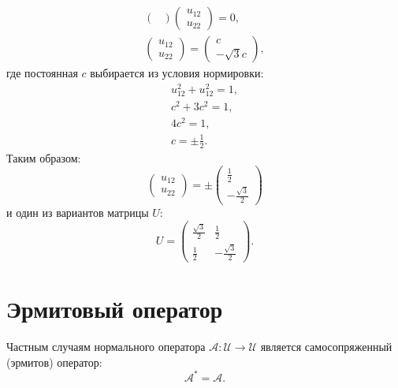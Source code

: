 \begin{example}
\begin{gather*}
\begin{pmatrix}
        \end{pmatrix}
        \begin{pmatrix}
            u_{12} \\
            u_{22}
        \end{pmatrix}
        = 0 , \\
        \begin{pmatrix}
            u_{12} \\
            u_{22}
        \end{pmatrix}
        = \begin{pmatrix}
              c \\
              - \sqrt{3}  c
        \end{pmatrix} ,
    \end{gather*}
    где постоянная $c$ выбирается из условия нормировки:
    \begin{gather*}
        u_{12}^2 + u_{12}^2 = 1 , \\
        c^2 + 3 c^2 = 1 , \\
        4 c^2 = 1 , \\
        c = \pm \frac{1}{2} .
    \end{gather*}
    Таким образом:
    \[
        \begin{pmatrix}
            u_{12} \\
            u_{22}
        \end{pmatrix}
        = \pm \begin{pmatrix}
                  \frac{1}{2} \\
                  - \frac{\sqrt{3}}{2}
        \end{pmatrix}
    \]
    и один из вариантов матрицы $U$:
    \[
        U
        = \begin{pmatrix}
              \frac{\sqrt{3}}{2} & \frac{1}{2}          \\
              \frac{1}{2}        & - \frac{\sqrt{3}}{2}
        \end{pmatrix} .
    \]
\end{example}


\section{Эрмитовый оператор}

Частным случаям нормального оператора $\mathcal{A} : \mathcal{U} \rightarrow \mathcal{U}$ является самосопряженный (эрмитов) оператор:
\[
    \mathcal{A}^* = \mathcal{A}.
\]

